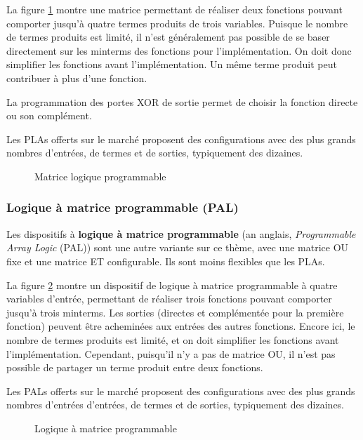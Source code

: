 \documentclass[11pt]{article}
\begin{document}
La figure \ref{fig:org8c322e8} montre une matrice permettant de
réaliser deux fonctions pouvant comporter jusqu'à quatre termes
produits de trois variables. Puisque le nombre de termes produits est
limité, il n'est généralement pas possible de se baser directement sur
les minterms des fonctions pour l'implémentation. On doit donc
simplifier les fonctions avant l'implémentation. Un même terme produit
peut contribuer à plus d'une fonction.

La programmation des portes XOR de sortie permet de choisir
la fonction directe ou son complément. 

Les PLAs offerts sur le marché proposent des configurations avec des
plus grands nombres d'entrées, de termes et de sorties, typiquement
des dizaines.

\begin{figure}[htbp]
\centering

\caption{\label{fig:org8c322e8}Matrice logique programmable}
\end{figure}

\subsubsection{Logique à matrice programmable (PAL)}
\label{sec:orga5784a7}

Les dispositifs à \textbf{logique à matrice programmable} (an anglais,
\emph{Programmable Array Logic} (PAL)) sont une autre variante sur ce
thème, avec une matrice OU fixe et une matrice ET configurable. Ils
sont moins flexibles que les PLAs.

La figure \ref{fig:org5181474} montre un dispositif de logique à matrice
programmable à quatre variables d'entrée, permettant de réaliser trois
fonctions pouvant comporter jusqu'à trois minterms. Les sorties
(directes et complémentée pour la première fonction) peuvent être
acheminées aux entrées des autres fonctions. Encore ici, le nombre de
termes produits est limité, et on doit simplifier les fonctions avant
l'implémentation. Cependant, puisqu'il n'y a pas de matrice OU, il
n'est pas possible de partager un terme produit entre deux fonctions.

Les PALs offerts sur le marché proposent des configurations avec des
plus grands nombres d'entrées d'entrées, de termes et de sorties,
typiquement des dizaines.


\begin{figure}[htbp]
\centering

\caption{\label{fig:org5181474}Logique à matrice programmable}
\end{figure}
\end{document}

